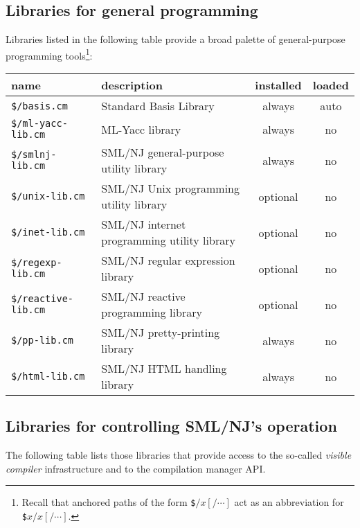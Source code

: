 \documentclass[titlepage,letterpaper]{article}
\begin{document}
\subsection{Libraries for general programming}

Libraries listed in the following table provide a broad palette of
general-purpose programming tools\footnote{Recall that anchored paths
of the form {\tt \$$/x[/\cdots]$} act as an abbreviation for {\tt
\$$x/x[/\cdots]$}.}:

\begin{center}
\begin{tabular}{p{2.3in}||p{2.8in}|c|c}
name & description & installed & loaded \\
\hline\hline
{\tt \$/basis.cm} & Standard Basis Library & always & auto \\
\hline\hline
{\tt \$/ml-yacc-lib.cm} & ML-Yacc library & always & no \\
\hline\hline
{\tt \$/smlnj-lib.cm} & SML/NJ general-purpose utility library &
always & no \\
\hline
{\tt \$/unix-lib.cm} & SML/NJ Unix programming utility library &
optional & no \\
\hline
{\tt \$/inet-lib.cm} & SML/NJ internet programming utility library &
optional & no \\
\hline
{\tt \$/regexp-lib.cm} & SML/NJ regular expression library & optional
& no \\
\hline
{\tt \$/reactive-lib.cm} & SML/NJ reactive programming library &
optional & no \\
\hline
{\tt \$/pp-lib.cm} & SML/NJ pretty-printing library & always & no \\
\hline
{\tt \$/html-lib.cm} & SML/NJ HTML handling library & always & no
\end{tabular}
\end{center}

\subsection{Libraries for controlling SML/NJ's operation}

The following table lists those libraries that provide access to the
so-called {\em visible compiler} infrastructure and to the compilation
manager API.
\end{document}
